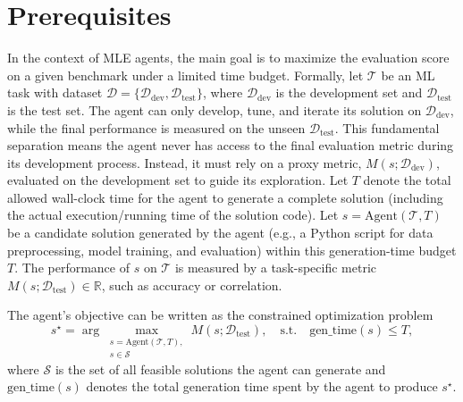 
\section{Prerequisites}
In the context of MLE agents, the main goal is to maximize the evaluation score on a given benchmark under a limited time budget.  
Formally, let $\mathcal{T}$ be an ML task with dataset $\mathcal{D} = \{\mathcal{D}_{\text{dev}}, \mathcal{D}_{\text{test}}\}$, where $\mathcal{D}_{\text{dev}}$ is the development set and $\mathcal{D}_{\text{test}}$ is the test set. The agent can only develop, tune, and iterate its solution on $\mathcal{D}_{\text{dev}}$, while the final performance is measured on the unseen $\mathcal{D}_{\text{test}}$.
This fundamental separation means the agent never has access to the final evaluation metric during its development process. Instead, it must rely on a proxy metric, $M(s; \mathcal{D}_{\text{dev}})$, evaluated on the development set to guide its exploration. 
Let $T$ denote the total allowed wall-clock time for the agent to generate a complete solution (including the actual execution/running time of the solution code).  
Let $s = \text{Agent}(\mathcal{T}, T)$ be a candidate solution generated by the agent (e.g., a Python script for data preprocessing, model training, and evaluation) within this generation-time budget $T$.  
The performance of $s$ on $\mathcal{T}$ is measured by a task-specific metric $M(s; \mathcal{D}_{\text{test}}) \in \mathbb{R}$, such as accuracy or correlation.  


The agent’s objective can be written as the constrained optimization problem  
\[
s^\star = \arg\max_{\substack{s = \text{Agent}(\mathcal{T}, T),\\ s \in \mathcal{S}}} M(s; \mathcal{D}_{\text{test}}), \quad \text{s.t.} \quad \text{gen\_time}(s) \le T,
\]  
where $\mathcal{S}$ is the set of all feasible solutions the agent can generate and $\text{gen\_time}(s)$ denotes the total generation time spent by the agent to produce $s^\star$.

